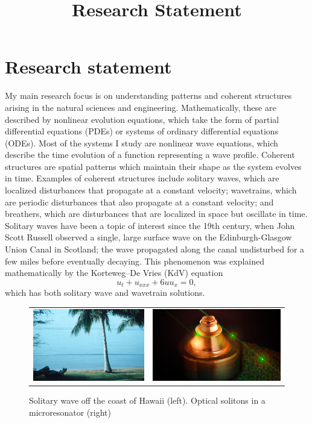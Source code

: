 \documentclass[12pt,reqno,oneside,hidelinks]{article}
\title{Research Statement}
\date{\vspace{-12ex}}
\begin{document}
\thispagestyle{empty}

\section*{Research statement}

My main research focus is on understanding patterns and coherent structures arising in the natural sciences and engineering. Mathematically, these are described by nonlinear evolution equations, which take the form of partial differential equations (PDEs) or systems of ordinary differential equations (ODEs). Most of the systems I study are nonlinear wave equations, which describe the time evolution of a function representing a wave profile. Coherent structures are spatial patterns which maintain their shape as the system evolves in time. Examples of coherent structures include solitary waves, which are localized disturbances that propagate at a constant velocity; wavetrains, which are periodic disturbances that also propagate at a constant velocity; and breathers, which are disturbances that are localized in space but oscillate in time. Solitary waves have been a topic of interest since the 19th century, when John Scott Russell observed a single, large surface wave on the Edinburgh-Glasgow Union Canal in Scotland; the wave propagated along the canal undisturbed for a few miles before eventually decaying. This phenomenon was explained mathematically by the Korteweg–De Vries (KdV) equation 
\[
u_t + u_{xxx} + 6 u u_x = 0,
\]
which has both solitary wave and wavetrain solutions.
\begin{figure}[H]
    \centering
    \begin{tabular}{cc}
        \includegraphics[width=7cm]{images/SolitaryWaveHawaii.png} &
        \includegraphics[width=8.1cm]{images/resonator.jpg} 
    \end{tabular}
    \caption{Solitary wave off the coast of Hawaii \cite{Andriopoulos2009} (left). Optical solitons in a microresonator \cite{MarinPalomo2017} (right) }
    \label{fig:solitarywaves}
\end{figure}
\end{document}
